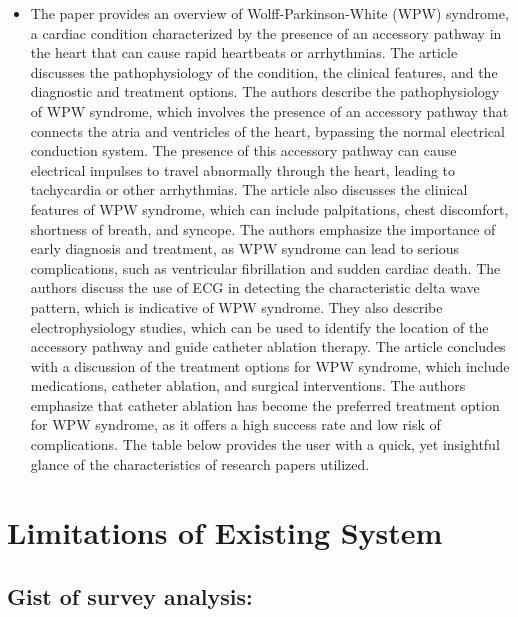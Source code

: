 \begin{itemize}
	\item The paper provides an overview of Wolff-Parkinson-White (WPW) syndrome, a cardiac condition characterized by the presence of an accessory pathway in the heart that can cause rapid heartbeats or arrhythmias. The article discusses the pathophysiology of the condition, the clinical features, and the diagnostic and treatment options. The authors describe the pathophysiology of WPW syndrome, which involves the presence of an accessory pathway that connects the atria and ventricles of the heart, bypassing the normal electrical conduction system. The presence of this accessory pathway can cause electrical impulses to travel abnormally through the heart, leading to tachycardia or other arrhythmias. The article also discusses the clinical features of WPW syndrome, which can include palpitations, chest discomfort, shortness of breath, and syncope. The authors emphasize the importance of early diagnosis and treatment, as WPW syndrome can lead to serious complications, such as ventricular fibrillation and sudden cardiac death. The authors discuss the use of ECG in detecting the characteristic delta wave pattern, which is indicative of WPW syndrome. They also describe electrophysiology studies, which can be used to identify the location of the accessory pathway and guide catheter ablation therapy. The article concludes with a discussion of the treatment options for WPW syndrome, which include medications, catheter ablation, and surgical interventions. The authors emphasize that catheter ablation has become the preferred treatment option for WPW syndrome, as it offers a high success rate and low risk of complications. The table below provides the user with a quick, yet insightful glance of the characteristics of research papers utilized. 
\end{itemize}

\section*{Limitations of Existing System}

\subsection*{Gist of survey analysis:}   

